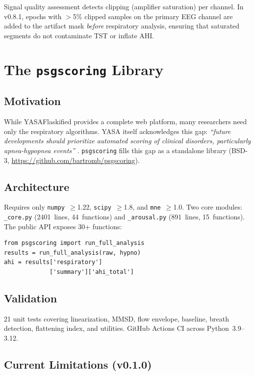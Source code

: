 \documentclass[11pt,a4paper,twocolumn]{article}
\begin{document}
Signal quality assessment detects clipping (amplifier saturation) per channel. In v0.8.1, epochs with $>$5\% clipped samples on the primary EEG channel are added to the artifact mask \emph{before} respiratory analysis, ensuring that saturated segments do not contaminate TST or inflate AHI.


\section{The \texttt{psgscoring} Library}

\subsection{Motivation}

While YASAFlaskified provides a complete web platform, many researchers need only the respiratory algorithms. YASA itself acknowledges this gap: \emph{``future developments should prioritize automated scoring of clinical disorders, particularly apnea-hypopnea events''} \cite{vallat2021}. \texttt{psgscoring} fills this gap as a standalone library (BSD-3, \url{https://github.com/bartromb/psgscoring}).

\subsection{Architecture}

Requires only \texttt{numpy}~$\geq$1.22, \texttt{scipy}~$\geq$1.8, and \texttt{mne}~$\geq$1.0. Two core modules: \texttt{\_core.py} (2401~lines, 44~functions) and \texttt{\_arousal.py} (891~lines, 15~functions). The public API exposes 30+ functions:

{\small\begin{verbatim}
from psgscoring import run_full_analysis
results = run_full_analysis(raw, hypno)
ahi = results['respiratory']
             ['summary']['ahi_total']
\end{verbatim}}

\subsection{Validation}

21 unit tests covering linearization, MMSD, flow envelope, baseline, breath detection, flattening index, and utilities. GitHub Actions CI across Python~3.9--3.12.

\subsection{Current Limitations (v0.1.0)}
\end{document}

